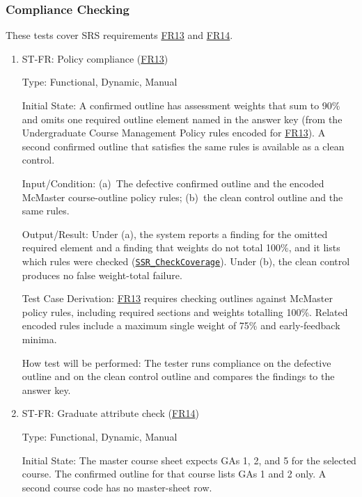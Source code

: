 \documentclass[12pt, titlepage]{article}
\newcounter{stnum}
\newcommand{\halink}[1]{\href{https://github.com/shivyam/cas-course-optimization/blob/main/pdfs/HazardAnalysis/HazardAnalysis.pdf}{#1}}
\newcommand{\frlink}[1]{\href{https://github.com/shivyam/cas-course-optimization/blob/main/pdfs/SRS-IEEE/SRS.pdf}{FR#1}}
\begin{document}
\subsubsection{Compliance Checking}

These tests cover SRS requirements \frlink{13} and \frlink{14}.

\begin{enumerate}

\item{ST-FR\thestnum \label{ST_Comp_Policy}: Policy compliance (\frlink{13})\\}

Type: Functional, Dynamic, Manual

Initial State: A confirmed outline has assessment weights that sum to 90\% and omits one required outline element named in the answer key (from the Undergraduate Course Management Policy rules encoded for \frlink{13}). A second confirmed outline that satisfies the same rules is available as a clean control.

Input/Condition: (a)~The defective confirmed outline and the encoded McMaster course-outline policy rules; (b)~the clean control outline and the same rules.

Output/Result: Under (a), the system reports a finding for the omitted required element and a finding that weights do not total 100\%, and it lists which rules were checked (\halink{\texttt{SSR\_CheckCoverage}}). Under (b), the clean control produces no false weight-total failure.

Test Case Derivation: \frlink{13} requires checking outlines against McMaster policy rules, including required sections and weights totalling 100\%. Related encoded rules include a maximum single weight of 75\% and early-feedback minima.

How test will be performed: The tester runs compliance on the defective outline and on the clean control outline and compares the findings to the answer key.


\item{ST-FR\thestnum \label{ST_Comp_Grad}: Graduate attribute check (\frlink{14})\\}

Type: Functional, Dynamic, Manual

Initial State: The master course sheet expects GAs 1, 2, and 5 for the selected course. The confirmed outline for that course lists GAs 1 and 2 only. A second course code has no master-sheet row.


\end{enumerate}
\end{document}
